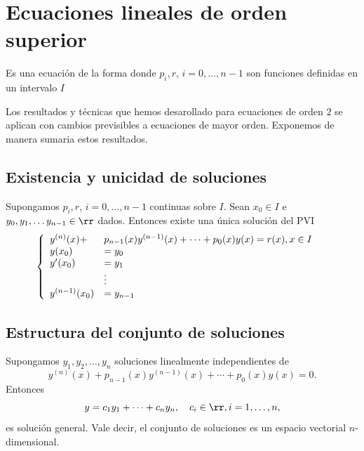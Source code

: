 \section{Ecuaciones lineales de orden superior}


\begin{definicion}{}
Es una ecuación de la forma
donde $p_i,r$, $i=0,\ldots,n-1$ son funciones definidas en un intervalo $I$
\end{definicion}


Los resultados y técnicas que hemos desarollado para ecuaciones de orden $2$ se aplican con cambios previsibles a ecuaciones de mayor orden. Exponemos de manera sumaria
estos resultados.

\subsection{Existencia y unicidad de soluciones}

\begin{teorema}{}
 Supongamos $p_i,r$, $i=0,\ldots,n-1$ continuas sobre $I$. Sean $x_0\in I$ e $y_0,y_1,\ldots y_{n-1}\in\rr$ dados. Entonces existe una única solución del PVI
 \[\left\{
 \begin{array}{l l l}
   y^{(n)}(x)+&p_{n-1}(x)y^{(n-1)}(x)+\cdots+p_0(x)y(x)=r(x),x\in I\\
   y(x_0)&=y_0&\\
   y'(x_0)&=y_1&\\
   &\vdots\\
  y^{(n-1)}(x_0)&=y_{n-1}&\\
  \end{array}\right.
\]

\end{teorema}


\subsection{Estructura del conjunto de soluciones}

\begin{teorema}{}
Supongamos $y_1,y_2,\ldots,y_n$ soluciones linealmente independientes de
\[y^{(n)}(x)+p_{n-1}(x)y^{(n-1)}(x)+\cdots+p_0(x)y(x)=0.\]
Entonces
\[y=c_1y_1+\cdots+c_ny_n,\quad c_i\in\rr, i=1,\ldots,n,\]
es solución general. Vale decir, el conjunto de soluciones es un espacio vectorial $n$-dimensional.
\end{teorema}



